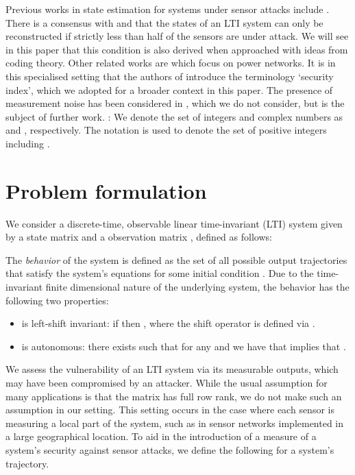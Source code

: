 \documentclass[letterpaper, 10 pt, conference]{ieeeconf}
\begin{document}
Previous works in state estimation for systems under sensor attacks include \cite{ChongWakaikiHespanhaACC15, fawziTD14, chenKarMouraICASSP15, pasqualetti2013attack, pasqualetti2015divide, pajic2015attack}. There is a consensus with \cite{fawziTD14} and \cite{ChongWakaikiHespanhaACC15} that the states of an LTI system can only be reconstructed if strictly less than half of the sensors are under attack. We will see in this paper that this condition is also derived when approached with ideas from coding theory. Other related works are \cite{HendrickxJJSS14, sandbergTJ2010} which focus on power networks. It is in this specialised setting that the authors of \cite{sandbergTJ2010} introduce the terminology `security index', which we adopted for a broader context in this paper. The presence of measurement noise has been considered in \cite{pajic2015attack}, which we do not consider, but is the subject of further work. 
\newline
{}: We denote the set of integers and complex numbers as  and , respectively. The notation  is used to denote the set of positive integers including .   


\section{Problem formulation}
We consider a discrete-time, observable linear time-invariant (LTI) system  given by a  state matrix  and a  observation matrix , defined as follows:

The {\em behavior}  of the system is defined as the set of all possible output trajectories  that satisfy the system's equations for some initial condition . Due to the time-invariant finite dimensional nature of the underlying system, the behavior  has the following two properties:
\begin{itemize}
\item  is left-shift invariant: if  then , where the shift operator  is defined via .
\item  is autonomous: there exists  such that for any  and  we have that  implies that .
\end{itemize} 
We assess the vulnerability of an LTI system via its measurable outputs, which may have been compromised by an attacker. While the usual assumption for many applications is that the matrix  has full row rank, we do not make such an assumption in our setting. This setting occurs in the case where each sensor is measuring a local part of the system, such as in sensor networks implemented in a large geographical location. To aid in the introduction of a measure of a system's security against sensor attacks, we define the following for a system's trajectory.
\end{document}
